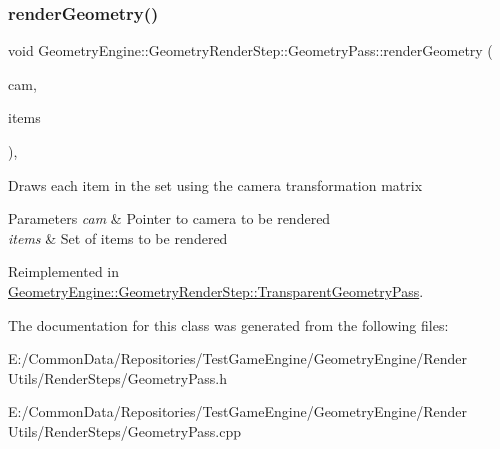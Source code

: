 \subsubsection{\texorpdfstring{renderGeometry()}{renderGeometry()}}
{\footnotesize\ttfamily void Geometry\+Engine\+::\+Geometry\+Render\+Step\+::\+Geometry\+Pass\+::render\+Geometry (\begin{DoxyParamCaption}\item[{\mbox{\hyperlink{class_geometry_engine_1_1_geometry_world_item_1_1_geometry_camera_1_1_camera}{Geometry\+World\+Item\+::\+Geometry\+Camera\+::\+Camera}} $\ast$}]{cam,  }\item[{std\+::unordered\+\_\+set$<$ \mbox{\hyperlink{class_geometry_engine_1_1_geometry_world_item_1_1_geometry_item_1_1_geometry_item}{Geometry\+World\+Item\+::\+Geometry\+Item\+::\+Geometry\+Item}} $\ast$ $>$ $\ast$}]{items }\end{DoxyParamCaption})\hspace{0.3cm}{\ttfamily [protected]}, {\ttfamily [virtual]}}

Draws each item in the set using the camera transformation matrix 
\begin{DoxyParams}{Parameters}
{\em cam} & Pointer to camera to be rendered \\
\hline
{\em items} & Set of items to be rendered \\
\hline
\end{DoxyParams}


Reimplemented in \mbox{\hyperlink{class_geometry_engine_1_1_geometry_render_step_1_1_transparent_geometry_pass_a22bae026c0e006318d5ab21bdaeeb247}{Geometry\+Engine\+::\+Geometry\+Render\+Step\+::\+Transparent\+Geometry\+Pass}}.



The documentation for this class was generated from the following files\+:\begin{DoxyCompactItemize}
\item 
E\+:/\+Common\+Data/\+Repositories/\+Test\+Game\+Engine/\+Geometry\+Engine/\+Render Utils/\+Render\+Steps/Geometry\+Pass.\+h\item 
E\+:/\+Common\+Data/\+Repositories/\+Test\+Game\+Engine/\+Geometry\+Engine/\+Render Utils/\+Render\+Steps/Geometry\+Pass.\+cpp\end{DoxyCompactItemize}
